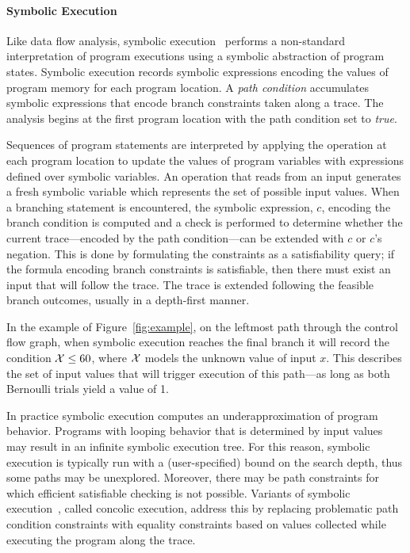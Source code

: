 \paragraph{Symbolic Execution}
Like data flow analysis, symbolic execution~\cite{king1976symbolic,clarke1976system} 
performs a non-standard interpretation of program executions using 
a symbolic abstraction of program states.
Symbolic execution records symbolic expressions encoding the
values of program memory for each program location.  
A \textit{path condition}
accumulates symbolic expressions that encode branch constraints 
taken along a trace.  
The analysis begins at the first
program location with the path condition set to \textit{true}.

Sequences of program statements are interpreted by applying the operation
at each program location to update the values of program
variables with expressions defined over symbolic variables.
An operation that reads from an input generates a fresh symbolic
variable which represents the set of possible input values.
When a branching statement is encountered, the symbolic expression, $c$, 
encoding the branch condition is computed and a check is performed
to determine whether the current trace---encoded by the path condition---can be
extended with $c$ or $c$'s negation.  
This is done by formulating the constraints
as a satisfiability query; if the formula encoding branch constraints
is satisfiable, then there must exist an input that will follow the trace.
The trace is extended following the feasible branch outcomes, usually
in a depth-first manner.

In the example of Figure~\ref{fig:example}, on the leftmost path through
the control flow graph, when symbolic execution reaches the 
final branch it will record the condition ${\cal X} \le 60$, where
${\cal X}$ models the unknown value of input $x$.  This describes the
set of input values that will trigger execution of this path---as long
as both Bernoulli trials yield a value of 1.

In practice symbolic execution computes an underapproximation of 
program behavior.
Programs with looping behavior that is determined by input values 
may result in an infinite symbolic execution tree. 
For this reason, symbolic execution is
typically run with a (user-specified) bound on the search depth, thus
some paths may be unexplored.   Moreover, there may be path constraints
for which efficient satisfiable checking is not possible.  Variants of
symbolic execution~\cite{godefroid2005dart,sen2005cute,song2008bitblaze},
called concolic execution, address this by replacing problematic 
path condition constraints with equality constraints based 
on values collected while executing the program along the trace.

